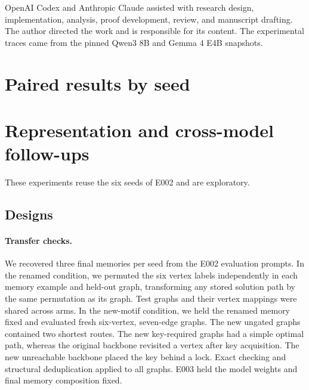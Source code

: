 \documentclass[11pt]{article}
\begin{document}
OpenAI Codex and Anthropic Claude assisted with research design,
implementation, analysis, proof development, review, and manuscript
drafting. The author directed the work and is responsible for its
content. The experimental traces came from the pinned Qwen3 8B and
Gemma 4 E4B snapshots.

\appendix
\section{Paired results by seed}
\label{app:seed-scores}




\section{Representation and cross-model follow-ups}
\label{app:followups}

These experiments reuse the six seeds of E002 and are exploratory.

\subsection{Designs}

\paragraph{Transfer checks.} We recovered three final memories per
seed from the E002 evaluation prompts. In the renamed condition, we
permuted the six vertex labels independently in each memory example
and held-out graph, transforming any stored solution path by the
same permutation as its graph. Test graphs and their vertex mappings
were shared across arms. In the new-motif condition, we held the
renamed memory fixed and evaluated fresh six-vertex, seven-edge
graphs. The new ungated graphs contained two shortest routes. The new
key-required graphs had a simple optimal path, whereas the original
backbone revisited a vertex after key acquisition. The new unreachable
backbone placed the key behind a lock. Exact checking and structural
deduplication applied to all graphs. E003 held the model weights and
final memory composition fixed.
\end{document}
